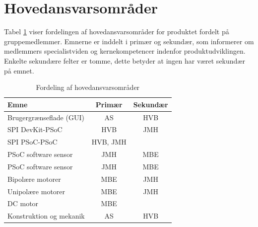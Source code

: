 \section{Hovedansvarsområder}
Tabel \ref{tab:ansvar} viser fordelingen af hovedansvarsområder for produktet fordelt på gruppemedlemmer. Emnerne er inddelt i primær og sekundær, som informerer om 
medlemmers specialistviden og kernekompetencer indenfor produktudviklingen. Enkelte sekundære felter er tomme, dette betyder at ingen har været sekundær på 
emnet.

\begin{table}[H]
	\centering
	\begin{tabular}{| l | c | c |}
		\hline
		Emne & Primær & Sekundær\\\hline
		Brugergrænseflade (GUI) & AS & HVB\\\hline
		SPI DevKit-PSoC & HVB & JMH\\\hline
		SPI PSoC-PSoC & HVB, JMH & \\\hline
		PSoC software sensor & JMH & MBE\\\hline
		PSoC software sensor & JMH & MBE\\\hline
		Bipolære motorer & MBE & JMH\\\hline
		Unipolære motorer & MBE & JMH\\\hline
		DC motor & MBE & \\\hline
		Konstruktion og mekanik & AS & HVB\\\hline
	\end{tabular}
	\caption{Fordeling af hovedansvarsområder}
	\label{tab:ansvar}
\end{table}